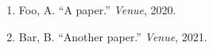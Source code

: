 
\begin{enumerate}
\def\labelenumi{\arabic{enumi}.}
\item
  Foo, A. ``A paper.'' \emph{Venue}, 2020. \cites{12}
\item
  Bar, B. ``Another paper.'' \emph{Venue}, 2021.
\end{enumerate}
